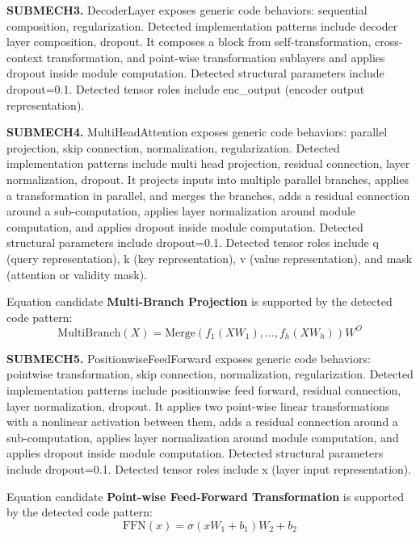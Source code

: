 \textbf{SUBMECH3.} DecoderLayer exposes generic code behaviors: sequential composition, regularization. Detected implementation patterns include decoder layer composition, dropout. It composes a block from self-transformation, cross-context transformation, and point-wise transformation sublayers and applies dropout inside module computation. Detected structural parameters include dropout=0.1. Detected tensor roles include enc\_output (encoder output representation).

\textbf{SUBMECH4.} MultiHeadAttention exposes generic code behaviors: parallel projection, skip connection, normalization, regularization. Detected implementation patterns include multi head projection, residual connection, layer normalization, dropout. It projects inputs into multiple parallel branches, applies a transformation in parallel, and merges the branches, adds a residual connection around a sub-computation, applies layer normalization around module computation, and applies dropout inside module computation. Detected structural parameters include dropout=0.1. Detected tensor roles include q (query representation), k (key representation), v (value representation), and mask (attention or validity mask).

Equation candidate \textbf{Multi-Branch Projection} is supported by the detected code pattern:
\[
\mathrm{MultiBranch}(X)=\mathrm{Merge}(f_1(XW_1),\ldots,f_h(XW_h))W^O
\]

\textbf{SUBMECH5.} PositionwiseFeedForward exposes generic code behaviors: pointwise transformation, skip connection, normalization, regularization. Detected implementation patterns include positionwise feed forward, residual connection, layer normalization, dropout. It applies two point-wise linear transformations with a nonlinear activation between them, adds a residual connection around a sub-computation, applies layer normalization around module computation, and applies dropout inside module computation. Detected structural parameters include dropout=0.1. Detected tensor roles include x (layer input representation).

Equation candidate \textbf{Point-wise Feed-Forward Transformation} is supported by the detected code pattern:
\[
\mathrm{FFN}(x)=\sigma(xW_1+b_1)W_2+b_2
\]

